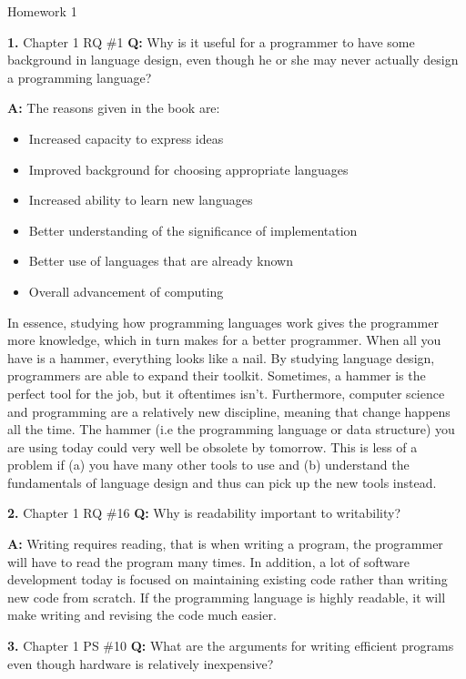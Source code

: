 \documentclass[letterpaper, 11pt]{article}
\newcommand{\hwnumbersec}[3]{\medskip \noindent\textbf{#1.} Chapter #2 #3
\newline\noindent\textbf{Q:}}
\newcommand{\A}{\noindent\textbf{A:} }
\begin{document}
\begin{center}
	{\LARGE Homework 1}\\
\end{center}

\hwnumbersec{1}{1}{RQ \#1}
Why is it useful for a programmer to have some background in language design,
even though he or she may never actually design a programming language?

\A The reasons given in the book are: 
\begin{itemize}
\item Increased capacity to express ideas
\item Improved background for choosing appropriate languages
\item Increased ability to learn new languages
\item Better understanding of the significance of implementation
\item Better use of languages that are already known
\item Overall advancement of computing
\end{itemize}

In essence, studying how programming languages work gives the programmer more
knowledge, which in turn makes for a better programmer. When all you have is a
hammer, everything looks like a nail. By studying language design, programmers
are able to expand their toolkit. Sometimes, a hammer is the perfect tool for
the job, but it oftentimes isn't. Furthermore, computer science and programming
are a relatively new discipline, meaning that change happens all the time. The
hammer (i.e the programming language or data structure) you are using today
could very well be obsolete by tomorrow. This is less of a problem if (a) you
have many other tools to use and (b) understand the fundamentals of language
design and thus can pick up the new tools instead.  

\hwnumbersec{2}{1}{RQ \#16}
Why is readability important to writability?

\A Writing requires reading, that is when writing a program, the programmer will
have to read the program many times. In addition, a lot of software development
today is focused on maintaining existing code rather than writing new code from
scratch. If the programming language is highly readable, it will make writing
and revising the code much easier.  

\hwnumbersec{3}{1}{PS \#10}
What are the arguments for writing efficient programs even though hardware is
relatively inexpensive?
\end{document}
